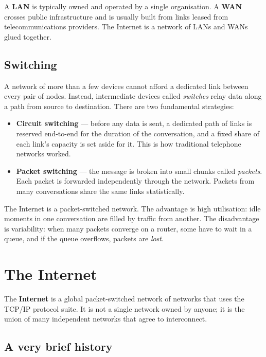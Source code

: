 \documentclass[
  letterpaper,
  DIV=11,
  numbers=noendperiod]{scrreprt}
\providecommand{\tightlist}{%
  \setlength{\itemsep}{0pt}\setlength{\parskip}{0pt}}
\begin{document}
A \textbf{LAN} is typically owned and operated by a single organisation.
A \textbf{WAN} crosses public infrastructure and is usually built from
links leased from telecommunications providers. The Internet is a
network of LANs and WANs glued together.

\subsection{Switching}\label{sec-switching}

A network of more than a few devices cannot afford a dedicated link
between every pair of nodes. Instead, intermediate devices called
\emph{switches} relay data along a path from source to destination.
There are two fundamental strategies:

\begin{itemize}
\tightlist
\item
  \textbf{Circuit switching} --- before any data is sent, a dedicated
  path of links is reserved end-to-end for the duration of the
  conversation, and a fixed share of each link's capacity is set aside
  for it. This is how traditional telephone networks worked.
\item
  \textbf{Packet switching} --- the message is broken into small chunks
  called \emph{packets}. Each packet is forwarded independently through
  the network. Packets from many conversations share the same links
  statistically.
\end{itemize}

The Internet is a packet-switched network. The advantage is high
utilisation: idle moments in one conversation are filled by traffic from
another. The disadvantage is variability: when many packets converge on
a router, some have to wait in a queue, and if the queue overflows,
packets are \emph{lost}.

\section{The Internet}\label{sec-internet}

The \textbf{Internet} is a global packet-switched network of networks
that uses the TCP/IP protocol suite. It is not a single network owned by
anyone; it is the union of many independent networks that agree to
interconnect.

\subsection{A very brief history}\label{a-very-brief-history}
\end{document}
